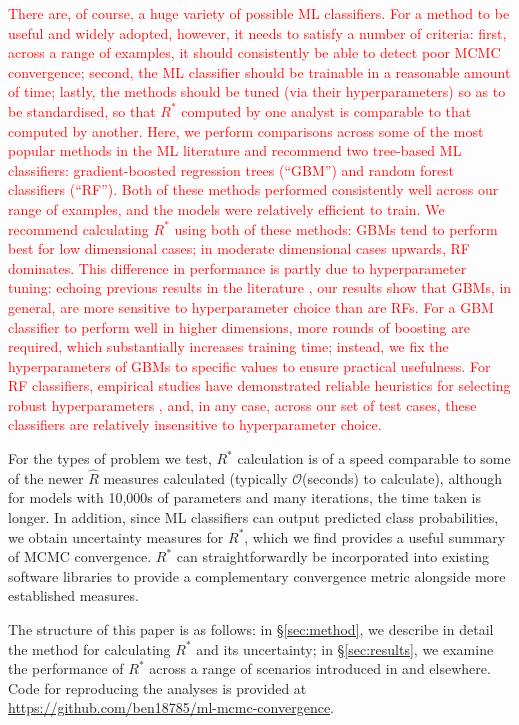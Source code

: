 \documentclass{article}
\begin{document}
\textcolor{red}{There are, of course, a huge variety of possible ML classifiers. For a method to be useful and widely adopted, however, it needs to satisfy a number of criteria: first, across a range of examples, it should consistently be able to detect poor MCMC convergence; second, the ML classifier should be trainable in a reasonable amount of time; lastly, the methods should be tuned (via their hyperparameters) so as to be standardised, so that $R^*$ computed by one analyst is comparable to that computed by another. Here, we perform comparisons across some of the most popular methods in the ML literature and recommend two tree-based ML classifiers: gradient-boosted regression trees \citep{friedman2001greedy,greenwell2019package} (``GBM'') and random forest classifiers \citep{breiman2001random} (``RF''). Both of these methods performed consistently well across our range of examples, and the models were relatively efficient to train. We recommend calculating $R^*$ using both of these methods: GBMs tend to perform best for low dimensional cases; in moderate dimensional cases upwards, RF dominates. This difference in performance is partly due to hyperparameter tuning: echoing previous results in the literature \cite[Chapters~11\&12]{boehmke2019hands}, our results show that GBMs, in general, are more sensitive to hyperparameter choice than are RFs. For a GBM classifier to perform well in higher dimensions, more rounds of boosting are required, which substantially increases training time; instead, we fix the hyperparameters of GBMs to specific values to ensure practical usefulness. For RF classifiers, empirical studies have demonstrated reliable heuristics for selecting robust hyperparameters \citep{bernard2009influence}, and, in any case, across our set of test cases, these classifiers are relatively insensitive to hyperparameter choice.}

For the types of problem we test, $R^*$ calculation is of a speed comparable to some of the newer $\widehat{R}$ measures calculated (typically $\mathcal{O}$(seconds) to calculate), although for models with 10,000s of parameters and many iterations, the time taken is longer. In addition, since ML classifiers can output predicted class probabilities, we obtain uncertainty measures for $R^*$, which we find provides a useful summary of MCMC convergence. $R^*$ can straightforwardly be incorporated into existing software libraries to provide a complementary convergence metric alongside more established measures.

The structure of this paper is as follows: in \S\ref{sec:method}, we describe in detail the method for calculating $R^*$ and its uncertainty; in \S\ref{sec:results}, we examine the performance of $R^*$ across a range of scenarios introduced in \cite{vehtari2019rank} and elsewhere. Code for reproducing the analyses is provided at \url{https://github.com/ben18785/ml-mcmc-convergence}.
\end{document}
